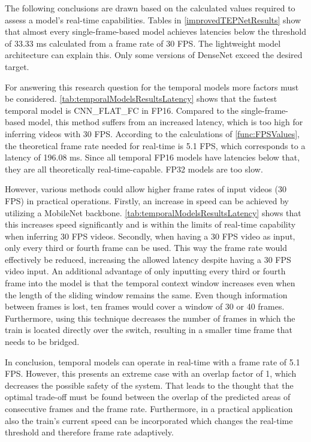 The following conclusions are drawn based on the calculated values required to assess a model's real-time capabilities.
Tables in \autoref{improvedTEPNetResults} show that almost every single-frame-based model achieves latencies below the threshold of 33.33 ms calculated from a frame rate of 30 \ac{FPS}.
The lightweight model architecture can explain this.
Only some versions of DenseNet exceed the desired target.

For answering this research question for the temporal models more factors must be considered.
\autoref{tab:temporalModelsResultsLatency} shows that the fastest temporal model is CNN\_FLAT\_FC in FP16.
Compared to the single-frame-based model, this method suffers from an increased latency, which is too high for inferring videos with 30 \ac{FPS}.
According to the calculations of \autoref{func:FPSValues}, the theoretical frame rate needed for real-time is 5.1 \ac{FPS}, which corresponds to a latency of 196.08 ms.
Since all temporal FP16 models have latencies below that, they are all theoretically real-time-capable.
FP32 models are too slow.

However, various methods could allow higher frame rates of input videos (30 \ac{FPS}) in practical operations.
Firstly, an increase in speed can be achieved by utilizing a MobileNet backbone.
\autoref{tab:temporalModelsResultsLatency} shows that this increases speed significantly and is within the limits of real-time capability when inferring 30 \ac{FPS} videos.
Secondly, when having a 30 \ac{FPS} video as input, only every third or fourth frame can be used.
This way the frame rate would effectively be reduced, increasing the allowed latency despite having a 30 \ac{FPS} video input.
An additional advantage of only inputting every third or fourth frame into the model is that the temporal context window increases even when the length of the sliding window remains the same.
Even though information between frames is lost, ten frames would cover a window of 30 or 40 frames.
Furthermore, using this technique decreases the number of frames in which the train is located directly over the switch, resulting in a smaller time frame that needs to be bridged.

In conclusion, temporal models can operate in real-time with a frame rate of 5.1 \ac{FPS}.
However, this presents an extreme case with an overlap factor of 1, which decreases the possible safety of the system.
That leads to the thought that the optimal trade-off must be found between the overlap of the predicted areas of consecutive frames and the frame rate.
Furthermore, in a practical application also the train's current speed can be incorporated which changes the real-time threshold and therefore frame rate adaptively.

